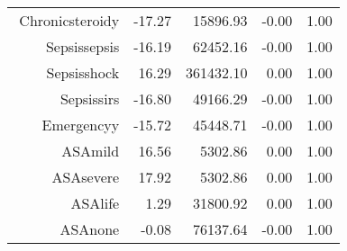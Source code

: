 \begin{tabular}{rrrrr}
$$  Chronic\-steroid\-y & -17.27 & 15896.93 & -0.00 & 1.00 \\ 
  Sepsis\-sepsis & -16.19 & 62452.16 & -0.00 & 1.00 \\ 
  Sepsis\-shock & 16.29 & 361432.10 & 0.00 & 1.00 \\ 
  Sepsis\-sirs & -16.80 & 49166.29 & -0.00 & 1.00 \\ 
  Emergency\-y & -15.72 & 45448.71 & -0.00 & 1.00 \\ 
  ASA\-mild & 16.56 & 5302.86 & 0.00 & 1.00 \\ 
  ASA\-severe & 17.92 & 5302.86 & 0.00 & 1.00 \\ 
  ASA\-life & 1.29 & 31800.92 & 0.00 & 1.00 \\ 
  ASA\-none & -0.08 & 76137.64 & -0.00 & 1.00 \\ 
   \hline
\end{tabular}

